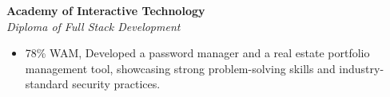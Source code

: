 \documentclass[12pt]{article}
\begin{document}
\textbf{Academy of Interactive Technology} \\
\indent \textit{\color{subtextgray}Diploma of Full Stack Development}
\begin{itemize}[topsep=0em, left=0.8em]	
  \item 78\% WAM, Developed a password manager and a real estate portfolio management tool, showcasing strong problem-solving skills and industry-standard security practices.
\end{itemize}
\end{document}
